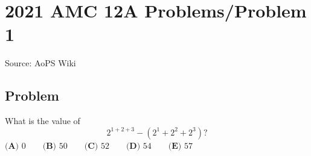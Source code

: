 \documentclass[12pt]{article}
\begin{document}
\section*{{2021 AMC 12A Problems/Problem 1}}
Source: AoPS Wiki

\subsection*{Problem}
What is the value of \[2^{1+2+3}-(2^1+2^2+2^3)?\] $\textbf{(A) }0 \qquad \textbf{(B) }50 \qquad \textbf{(C) }52 \qquad \textbf{(D) }54 \qquad \textbf{(E) }57$
\end{document}
